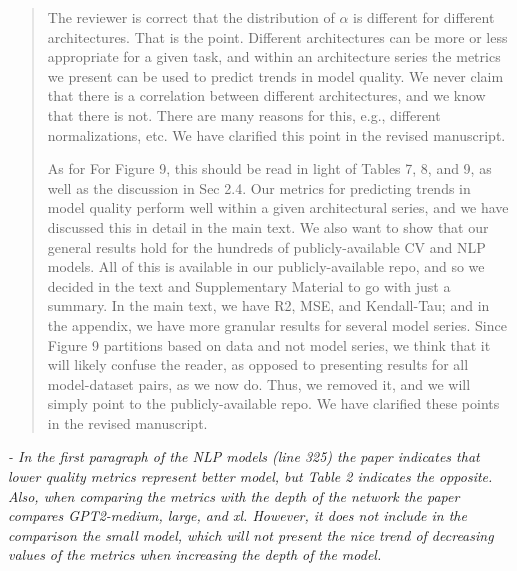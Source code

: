\documentclass[11pt]{article}
\begin{document}
\begin{quote}
The reviewer is correct that the distribution of $\alpha$ is different for different architectures.
That is the point.
Different architectures can be more or less appropriate for a given task, and within an architecture series the metrics we present can be used to predict trends in model quality.
We never claim that there is a correlation between different architectures, and we know that there is not.
There are many reasons for this, e.g., different normalizations, etc.
We have clarified this point
in the revised manuscript.

As for For Figure 9, this should be read in light of Tables 7, 8, and 9, as well as the discussion in Sec 2.4.  
Our metrics for predicting trends in model quality perform well within a given architectural series, and we have discussed this in detail in the main text.
We also want to show that our general results hold for the hundreds of publicly-available CV and NLP models.
All of this is available in our publicly-available repo, and so we decided in the text and Supplementary Material to go with just a summary.
In the main text, we have R2, MSE, and Kendall-Tau; and in the appendix, we have more granular results for several model series.
Since Figure 9 partitions based on data and not model series, we think that it will likely confuse the reader, as opposed to presenting results for all model-dataset pairs, as we now do.
Thus, we removed it, and we will simply point to the publicly-available repo.
%
We have clarified these points
in the revised manuscript.

\end{quote}

\noindent
\emph{%
- In the first paragraph of the NLP models (line 325) the paper indicates that lower quality metrics represent better model, but Table 2 indicates the opposite. Also, when comparing the metrics with the depth of the network the paper compares GPT2-medium, large, and xl. However, it does not include in the comparison the small model, which will not present the nice trend of decreasing values of the metrics when increasing the depth of the model.
}
\end{document}
